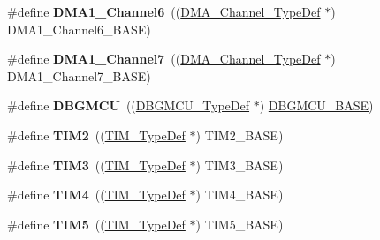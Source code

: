 \begin{DoxyCompactItemize}
\item 
\hypertarget{group___peripheral__declaration_gac013c4376e4797831b5ddd2a09519df8}{\#define {\bfseries D\-M\-A1\-\_\-\-Channel6}~((\hyperlink{struct_d_m_a___channel___type_def}{D\-M\-A\-\_\-\-Channel\-\_\-\-Type\-Def} $\ast$) D\-M\-A1\-\_\-\-Channel6\-\_\-\-B\-A\-S\-E)}\label{group___peripheral__declaration_gac013c4376e4797831b5ddd2a09519df8}

\item 
\hypertarget{group___peripheral__declaration_ga4f9c23b3d1add93ed206b5c9afa5cda3}{\#define {\bfseries D\-M\-A1\-\_\-\-Channel7}~((\hyperlink{struct_d_m_a___channel___type_def}{D\-M\-A\-\_\-\-Channel\-\_\-\-Type\-Def} $\ast$) D\-M\-A1\-\_\-\-Channel7\-\_\-\-B\-A\-S\-E)}\label{group___peripheral__declaration_ga4f9c23b3d1add93ed206b5c9afa5cda3}

\item 
\hypertarget{group___peripheral__declaration_ga92ec6d9ec2251fda7d4ce09748cd74b4}{\#define {\bfseries D\-B\-G\-M\-C\-U}~((\hyperlink{struct_d_b_g_m_c_u___type_def}{D\-B\-G\-M\-C\-U\-\_\-\-Type\-Def} $\ast$) \hyperlink{group___peripheral__memory__map_ga4adaf4fd82ccc3a538f1f27a70cdbbef}{D\-B\-G\-M\-C\-U\-\_\-\-B\-A\-S\-E})}\label{group___peripheral__declaration_ga92ec6d9ec2251fda7d4ce09748cd74b4}

\item 
\hypertarget{group___peripheral__declaration_ga3cfac9f2e43673f790f8668d48b4b92b}{\#define {\bfseries T\-I\-M2}~((\hyperlink{struct_t_i_m___type_def}{T\-I\-M\-\_\-\-Type\-Def} $\ast$) T\-I\-M2\-\_\-\-B\-A\-S\-E)}\label{group___peripheral__declaration_ga3cfac9f2e43673f790f8668d48b4b92b}

\item 
\hypertarget{group___peripheral__declaration_ga61ee4c391385607d7af432b63905fcc9}{\#define {\bfseries T\-I\-M3}~((\hyperlink{struct_t_i_m___type_def}{T\-I\-M\-\_\-\-Type\-Def} $\ast$) T\-I\-M3\-\_\-\-B\-A\-S\-E)}\label{group___peripheral__declaration_ga61ee4c391385607d7af432b63905fcc9}

\item 
\hypertarget{group___peripheral__declaration_ga91a09bad8bdc7a1cb3d85cf49c94c8ec}{\#define {\bfseries T\-I\-M4}~((\hyperlink{struct_t_i_m___type_def}{T\-I\-M\-\_\-\-Type\-Def} $\ast$) T\-I\-M4\-\_\-\-B\-A\-S\-E)}\label{group___peripheral__declaration_ga91a09bad8bdc7a1cb3d85cf49c94c8ec}

\item 
\hypertarget{group___peripheral__declaration_ga5125ff6a23a2ed66e2e19bd196128c14}{\#define {\bfseries T\-I\-M5}~((\hyperlink{struct_t_i_m___type_def}{T\-I\-M\-\_\-\-Type\-Def} $\ast$) T\-I\-M5\-\_\-\-B\-A\-S\-E)}\label{group___peripheral__declaration_ga5125ff6a23a2ed66e2e19bd196128c14}


\end{DoxyCompactItemize}
